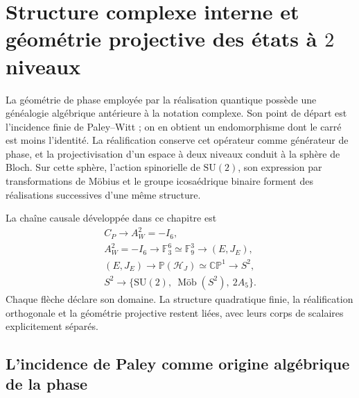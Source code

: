 \chapter{Structure complexe interne et géométrie projective des états à \(2\) niveaux}
\label{chap:geometria-proyectiva-bloch}

La géométrie de phase employée par la réalisation quantique possède une
généalogie algébrique antérieure à la notation complexe. Son point de départ est
l'incidence finie de Paley--Witt ; on en obtient un endomorphisme dont le
carré est moins l'identité. La réalification conserve cet opérateur comme
générateur de phase, et la projectivisation d'un espace à deux niveaux conduit
à la sphère de Bloch. Sur cette sphère, l'action spinorielle de
\(\mathrm{SU}(2)\), son expression par transformations de Möbius et le groupe
icosaédrique binaire forment des réalisations successives d'une même structure.

La chaîne causale développée dans ce chapitre est
\begin{equation}
 \boxed{
 \begin{gathered}
 C_P\longrightarrow A_W^2=-I_6,\\
 A_W^2=-I_6\longrightarrow
 \mathbb F_3^6\simeq\mathbb F_9^3
 \longrightarrow (E,J_E),\\
 (E,J_E)\longrightarrow
 \mathbb P(\mathcal H_J)\simeq\mathbb{CP}^{1}
 \longrightarrow S^2,\\
 S^2\longrightarrow
 \bigl\{\mathrm{SU}(2),\ \mathop{\text{M\"ob}}(S^2),\ 2A_5\bigr\}.
 \end{gathered}}
 \label{eq:cadena-paley-bloch-anexo}
\end{equation}
Chaque flèche déclare son domaine. La structure quadratique finie, la
réalification orthogonale et la géométrie projective restent liées, avec
leurs corps de scalaires explicitement séparés.

\section{L'incidence de Paley comme origine algébrique de la phase}

